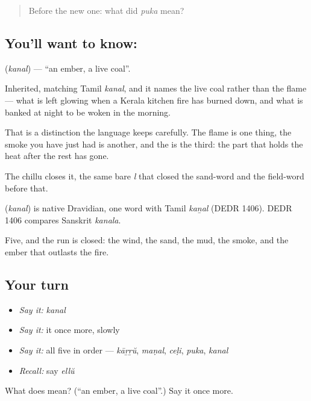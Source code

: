 \label{lesson:ML-C59-ember}



\begin{quote}
Before the new one: what did \emph{puka} mean?
\end{quote}

\subsection*{You'll want to know: }
\textbf{} (\emph{kanal}) — \textquotedblleft{}an ember, a live coal\textquotedblright{}.

Inherited, matching Tamil \emph{kanal}, and it names the live coal rather than the flame — what is left glowing when a Kerala kitchen fire has burned down, and what is banked at night to be woken in the morning.

That is a distinction the language keeps carefully. The flame is one thing, the smoke you have just had is another, and the  is the third: the part that holds the heat after the rest has gone.

The chillu  closes it, the same bare \emph{l} that closed the sand-word and the field-word before that.

\begin{cousinweb}
\textbf{} (\emph{kanal}) is native Dravidian, one word with Tamil \emph{kaṉal} (DEDR 1406). DEDR 1406 compares Sanskrit \emph{kanala}.
\end{cousinweb}

\begin{grammarlens}[title={What you've built}]
Five, and the run is closed: the wind, the sand, the mud, the smoke, and the ember that outlasts the fire.
\end{grammarlens}

\subsection*{Your turn}
\begin{itemize}
\raggedright
  \item \emph{Say it:} \emph{kanal}
  \item \emph{Say it:} it once more, slowly
  \item \emph{Say it:} all five in order — \emph{kāṟṟŭ}, \emph{maṇal}, \emph{ceḷi}, \emph{puka}, \emph{kanal}
  \item \emph{Recall:} say \emph{ellŭ}
\end{itemize}

\begin{tcolorbox}[breakable,colback=teal!4,colframe=teal!35!black,title={Before you move on}]
What does  mean? (\textquotedblleft{}an ember, a live coal\textquotedblright{}.) Say it once more.
\end{tcolorbox}
